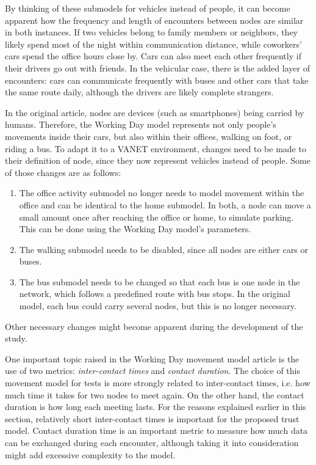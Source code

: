 By thinking of these submodels for vehicles instead of people, it can become apparent how the frequency and length of encounters between nodes are similar in both instances.
If two vehicles belong to family members or neighbors, they likely spend most of the night within communication distance, while coworkers' cars spend the office hours close by.
Cars can also meet each other frequently if their drivers go out with friends.
In the vehicular case, there is the added layer of encounters: cars can communicate frequently with buses and other cars that take the same route daily, although the drivers are likely complete strangers.

In the original article, nodes are devices (such as smartphones) being carried by humans.
Therefore, the Working Day model represents not only people's movements inside their cars, but also within their offices, walking on foot, or riding a bus.
To adapt it to a VANET environment, changes need to be made to their definition of node, since they now represent vehicles instead of people. Some of those changes are as follows:
\begin{enumerate}
\item
The office activity submodel no longer needs to model movement within the office and can be identical to the home submodel.
In both, a node can move a small amount once after reaching the office or home, to simulate parking.
This can be done using the Working Day model's parameters.
\item
The walking submodel needs to be disabled, since all nodes are either cars or buses.
\item
The bus submodel needs to be changed so that each bus is one node in the network, which follows a predefined route with bus stops.
In the original model, each bus could carry several nodes, but this is no longer necessary.
\end{enumerate}
Other necessary changes might become apparent during the development of the study.

One important topic raised in the Working Day movement model article is the use of two metrics: \textit{inter-contact times} and \textit{contact duration}.
The choice of this movement model for tests is more strongly related to inter-contact times, i.e. how much time it takes for two nodes to meet again.
On the other hand, the contact duration is how long each meeting lasts.
For the reasons explained earlier in this section, relatively short inter-contact times is important for the proposed trust model.
Contact duration time is an important metric to measure how much data can be exchanged during each encounter, although taking it into consideration might add excessive complexity to the model.

